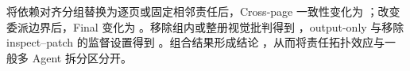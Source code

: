将依赖对齐分组替换为逐页或固定相邻责任后，Cross-page 一致性变化为 ；改变委派边界后，Final 变化为 。移除组内或整册视觉批判得到 ，output-only 与移除 inspect--patch 的监督设置得到 。组合结果形成结论 ，从而将责任拓扑效应与一般多 Agent 拆分区分开。
